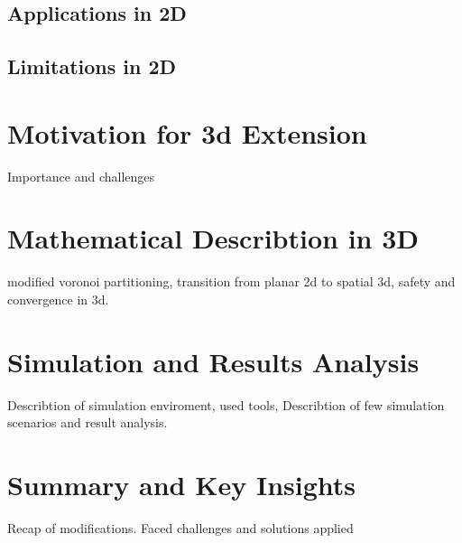     \subsection{Applications in 2D}

    \subsection{Limitations in 2D}


\section{Motivation for 3d Extension}

Importance and challenges

\section{Mathematical Describtion in 3D}

modified voronoi partitioning, transition from planar 2d to spatial 3d, safety and convergence in 3d.

\section{Simulation and Results Analysis}

Describtion of simulation enviroment, used tools, Describtion of few simulation scenarios and result analysis.

\section{Summary and Key Insights}

Recap of modifications. Faced challenges and solutions applied
